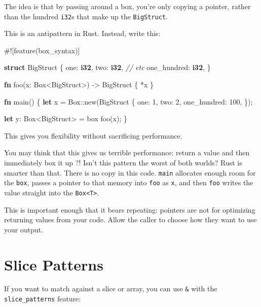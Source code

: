 \documentclass[a4paper,]{book}
\newenvironment{Shaded}{\begin{snugshade}}{\end{snugshade}}
\newcommand{\KeywordTok}[1]{\textcolor[rgb]{0.13,0.29,0.53}{\textbf{{#1}}}}
\newcommand{\DecValTok}[1]{\textcolor[rgb]{0.00,0.00,0.81}{{#1}}}
\newcommand{\CommentTok}[1]{\textcolor[rgb]{0.56,0.35,0.01}{\textit{{#1}}}}
\newcommand{\NormalTok}[1]{{#1}}
\begin{document}
The idea is that by passing around a box, you're only copying a pointer,
rather than the hundred \texttt{i32}s that make up the
\texttt{BigStruct}.

This is an antipattern in Rust. Instead, write this:

\begin{Shaded}
\begin{Highlighting}[]
\NormalTok{#![feature(box_syntax)]}

\KeywordTok{struct} \NormalTok{BigStruct \{}
    \NormalTok{one: }\KeywordTok{i32}\NormalTok{,}
    \NormalTok{two: }\KeywordTok{i32}\NormalTok{,}
    \CommentTok{// etc}
    \NormalTok{one_hundred: }\KeywordTok{i32}\NormalTok{,}
\NormalTok{\}}

\KeywordTok{fn} \NormalTok{foo(x: Box<BigStruct>) -> BigStruct \{}
    \NormalTok{*x}
\NormalTok{\}}

\KeywordTok{fn} \NormalTok{main() \{}
    \KeywordTok{let} \NormalTok{x = Box::new(BigStruct \{}
        \NormalTok{one: }\DecValTok{1}\NormalTok{,}
        \NormalTok{two: }\DecValTok{2}\NormalTok{,}
        \NormalTok{one_hundred: }\DecValTok{100}\NormalTok{,}
    \NormalTok{\});}

    \KeywordTok{let} \NormalTok{y: Box<BigStruct> = box foo(x);}
\NormalTok{\}}
\end{Highlighting}
\end{Shaded}

This gives you flexibility without sacrificing performance.

You may think that this gives us terrible performance: return a value
and then immediately box it up ?! Isn't this pattern the worst of both
worlds? Rust is smarter than that. There is no copy in this code.
\texttt{main} allocates enough room for the \texttt{box}, passes a
pointer to that memory into \texttt{foo} as \texttt{x}, and then
\texttt{foo} writes the value straight into the
\texttt{Box\textless{}T\textgreater{}}.

This is important enough that it bears repeating: pointers are not for
optimizing returning values from your code. Allow the caller to choose
how they want to use your output.

\section{Slice Patterns}\label{sec--slice-patterns}

If you want to match against a slice or array, you can use \texttt{\&}
with the \texttt{slice\_patterns} feature:
\end{document}
